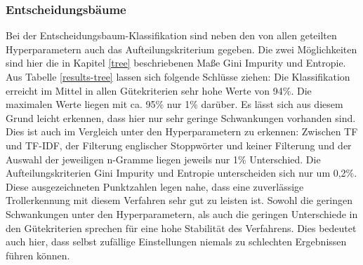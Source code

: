 \subsubsection{Entscheidungsbäume}
Bei der Entscheidungsbaum-Klassifikation sind neben den von allen geteilten Hyperparametern auch das Aufteilungskriterium gegeben. Die zwei Möglichkeiten sind hier die in Kapitel \ref{tree} beschriebenen Maße Gini Impurity und Entropie.\\
Aus Tabelle \ref{results-tree} lassen sich folgende Schlüsse ziehen:
Die Klassifikation erreicht im Mittel in allen Gütekriterien sehr hohe Werte von 94\%. Die maximalen Werte liegen mit ca. 95\% nur 1\% darüber. Es lässt sich aus diesem Grund leicht erkennen, dass hier nur sehr geringe Schwankungen vorhanden sind. Dies ist auch im Vergleich unter den Hyperparametern zu erkennen: Zwischen TF und TF-IDF, der Filterung englischer Stoppwörter und keiner Filterung und der Auswahl der jeweiligen n-Gramme liegen jeweils nur 1\% Unterschied. Die Aufteilungskriterien Gini Impurity und Entropie unterscheiden sich nur um 0,2\%.\\
Diese ausgezeichneten Punktzahlen legen nahe, dass eine zuverlässige Trollerkennung mit diesem Verfahren sehr gut zu leisten ist. Sowohl die geringen Schwankungen unter den Hyperparametern, als auch die geringen Unterschiede in den Gütekriterien sprechen für eine hohe Stabilität des Verfahrens. Dies bedeutet auch hier, dass selbst zufällige Einstellungen niemals zu schlechten Ergebnissen führen können.\\
